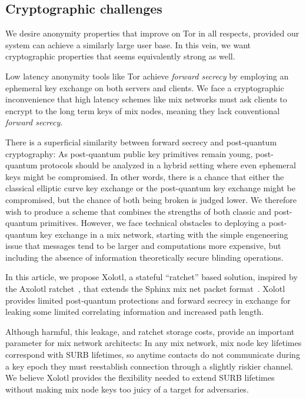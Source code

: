 \subsection{Cryptographic challenges}\label{subsec:challenges}

We desire anonymity properties that improve on Tor in all respects,
provided our system can achieve a similarly large user base.  
In this vein, we want cryptographic properties that seems equivalently
strong as well.

Low latency anonymity tools like Tor achieve {\em forward secrecy}
by employing an ephemeral key exchange on both servers and clients.
We face a cryptographic inconvenience that high latency schemes
like mix networks must ask clients to encrypt to the long term keys
of mix nodes, meaning they lack conventional {\em forward secrecy}.  

There is a superficial similarity between forward secrecy and
post-quantum cryptography: As post-quantum public key primitives
remain young, post-quantum protocols should be analyzed in a hybrid
setting where even ephemeral keys might be compromised.  
In other words, there is a chance that either the classical elliptic
curve key exchange or the post-quantum key exchange might be
compromised, but the chance of both being broken is judged lower.  
We therefore wish to produce a scheme that combines the strengths of
both classic and post-quantum primitives.  However, we face technical
obstacles to deploying a post-quantum key exchange in a mix network,
starting with the simple engeneering issue that messages tend to be
larger and computations more expensive, but including the absence
of information theoretically secure blinding operations.

In this article, we propose Xolotl, a stateful ``ratchet'' based
solution, inspired by the Axolotl ratchet~\cite{TextSecure}, that
extends the Sphinx mix net packet format~\cite{Sphinx}.  
Xolotl provides limited post-quantum protections and forward secrecy
in exchange for leaking some limited correlating information and
increased path length.  

Although harmful, this leakage, and ratchet storage costs, provide an
important parameter for mix network architects:  In any mix network,
mix node key lifetimes correspond with SURB lifetimes, so anytime
contacts do not communicate during a key epoch they must reestablish
connection through a slightly riskier channel.  We believe Xolotl
provides the flexibility needed to extend SURB lifetimes without
making mix node keys too juicy of a target for adversaries.

